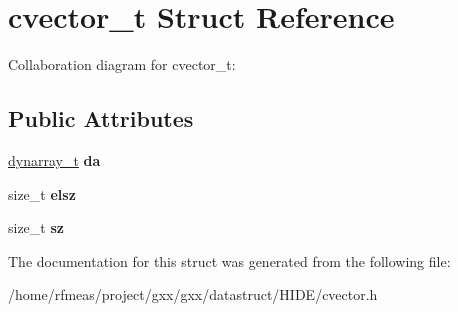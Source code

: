 \hypertarget{structcvector__t}{}\section{cvector\+\_\+t Struct Reference}
\label{structcvector__t}


Collaboration diagram for cvector\+\_\+t\+:
\subsection*{Public Attributes}
\begin{DoxyCompactItemize}
\item 
\hyperlink{structdynarray__t}{dynarray\+\_\+t} {\bfseries da}\hypertarget{structcvector__t_a57787c5295a7fb99662be920235c14fc}{}\label{structcvector__t_a57787c5295a7fb99662be920235c14fc}

\item 
size\+\_\+t {\bfseries elsz}\hypertarget{structcvector__t_a5fbe091cf3647b5f6534fbc69529c1a8}{}\label{structcvector__t_a5fbe091cf3647b5f6534fbc69529c1a8}

\item 
size\+\_\+t {\bfseries sz}\hypertarget{structcvector__t_a07cb708e3aad0103fb99cf8baab92aa1}{}\label{structcvector__t_a07cb708e3aad0103fb99cf8baab92aa1}

\end{DoxyCompactItemize}


The documentation for this struct was generated from the following file\+:\begin{DoxyCompactItemize}
\item 
/home/rfmeas/project/gxx/gxx/datastruct/\+H\+I\+D\+E/cvector.\+h\end{DoxyCompactItemize}
